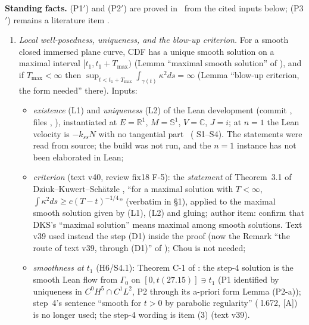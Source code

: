 \documentclass[11pt]{article}
\begin{document}
\noindent\textbf{Standing facts.} (P1$'$) and (P2$'$) are proved in  \tH\ from the cited inputs below; (P3$'$) remains a literature item \tH.
\begin{enumerate}[label=(P\arabic*$'$),leftmargin=3em]
\item \emph{Local well-posedness, uniqueness, and the blow-up criterion.} For a smooth closed immersed plane curve, CDF has a unique smooth solution on a maximal interval $[t_1,t_1+T_{\max})$ (Lemma ``maximal smooth solution'' of ), and if $T_{\max}<\infty$ then $\sup_{t<t_1+T_{\max}}\int_{\gamma(t)}\kappa^2ds=\infty$ (Lemma ``blow-up criterion, the form needed'' there). Inputs:
  \begin{itemize}[leftmargin=*]
  \item \emph{existence} (L1)  and \emph{uniqueness} (L2)  of the Lean development  \cite{CWFlow} (commit , files , ), instantiated at $E=\mathbb R^1$, $M=\mathbb S^1$, $V=\mathbb C$, $J=i$; at $n=1$ the Lean velocity is $-k_{ss}N$ with no tangential part \tS\ ( S1--S4). The statements were read from source; the build was not run, and the $n=1$ instance has not been elaborated in Lean;
  \item \emph{criterion} (text v40, review fix18 F-5): the \emph{statement} of Theorem~3.1 of Dziuk--Kuwert--Sch\"atzle \cite{DKS2002}, ``for a maximal solution with $T<\infty$, $\int\kappa^2ds\ge c(T-t)^{-1/4}$'' (verbatim in  \S1), applied to the maximal smooth solution given by (L1), (L2) and gluing; author item: confirm that DKS's ``maximal solution'' means maximal among smooth solutions. Text v39 used instead the step (D1) inside the proof (now the Remark ``the route of text v39, through (D1)'' of ); Chou \cite{Chou2003} is not needed;
  \item \emph{smoothness at $t_1$} (H6/S4.1): Theorem C-1 of  \tHd: the step-4 solution is the smooth Lean flow from $\Gamma_0$ on $[0,t(27.15)]\ni t_1$ (P1 identified by uniqueness in $C^0H^5\cap C^1L^2$, P2 through its a-priori form Lemma (P2-a)); step~4's sentence ``smooth for $t>0$ by parabolic regularity'' ( l.672, [A]) is no longer used; the step-4 wording is  item (3) (text v39).
  \end{itemize}

\end{enumerate}
\end{document}
